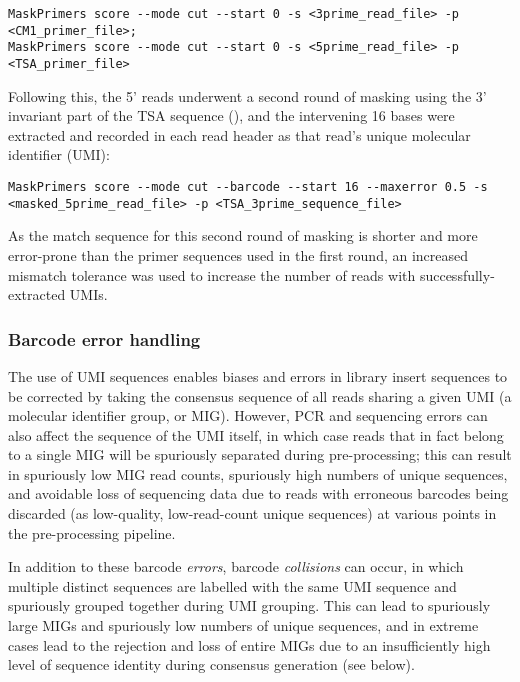 \begin{lstlisting}
MaskPrimers score --mode cut --start 0 -s <3prime_read_file> -p <CM1_primer_file>;
MaskPrimers score --mode cut --start 0 -s <5prime_read_file> -p <TSA_primer_file>
\end{lstlisting}

Following this, the 5' reads underwent a second round of masking using the 3' invariant part of the TSA sequence (), and the intervening 16 bases were extracted and recorded in each read header as that read's unique molecular identifier (UMI):

\begin{lstlisting}
MaskPrimers score --mode cut --barcode --start 16 --maxerror 0.5 -s <masked_5prime_read_file> -p <TSA_3prime_sequence_file>
\end{lstlisting}

As the match sequence for this second round of masking is shorter and more error-prone than the primer sequences used in the first round, an increased mismatch tolerance was used to increase the number of reads with successfully-extracted UMIs.

\subsubsection{Barcode error handling}
\label{sec:methods-comp-presto-correct}

The use of UMI sequences enables biases and errors in library insert sequences to be corrected by taking the consensus sequence of all reads sharing a given UMI (a molecular identifier group, or MIG). However, PCR and sequencing errors can also affect the sequence of the UMI itself, in which case reads that in fact belong to a single MIG will be spuriously separated during pre-processing; this can result in spuriously low MIG read counts, spuriously high numbers of unique sequences, and avoidable loss of sequencing data due to reads with erroneous barcodes being discarded (as low-quality, low-read-count unique sequences) at various points in the pre-processing pipeline.

In addition to these barcode \textit{errors}, barcode \textit{collisions} can occur, in which multiple distinct sequences are labelled with the same UMI sequence and spuriously grouped together during UMI grouping. This can lead to spuriously large MIGs and spuriously low numbers of unique sequences, and in extreme cases lead to the rejection and loss of entire MIGs due to an insufficiently high level of sequence identity during consensus generation (see below).

